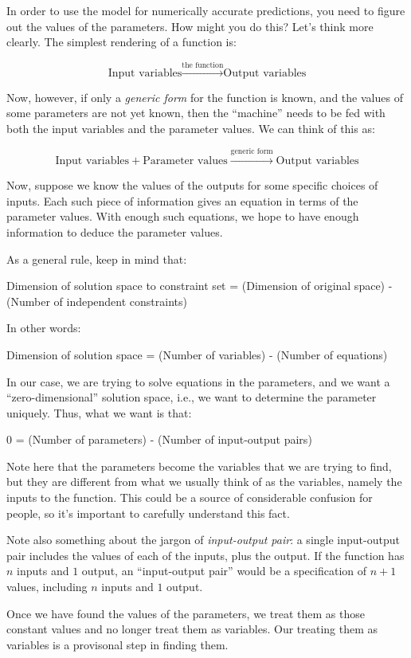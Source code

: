 \documentclass[10pt]{amsart}
\begin{document}
In order to use the model for numerically accurate predictions, you
need to figure out the values of the parameters. How might you do
this? Let's think more clearly. The simplest rendering of a function is:

$$\text{Input variables} \stackrel{\text{the function}}{\to} \text{Output variables}$$

Now, however, if only a {\em generic form} for the function is known,
and the values of some parameters are not yet known, then the
``machine'' needs to be fed with both the input variables and the parameter values. We can think of this as:

$$\text{Input variables} + \text{Parameter values} \stackrel{\text{generic form}}{\to} \text{Output variables}$$

Now, suppose we know the values of the outputs for some specific
choices of inputs. Each such piece of information gives an equation in
terms of the parameter values. With enough such equations, we hope to
have enough information to deduce the parameter values.

As a general rule, keep in mind that:

Dimension of solution space to constraint set = (Dimension of original space) - (Number of independent constraints)

In other words:

Dimension of solution space = (Number of variables) - (Number of equations)

In our case, we are trying to solve equations in the parameters, and
we want a ``zero-dimensional'' solution space, i.e., we want to
determine the parameter uniquely. Thus, what we want is that:

0 = (Number of parameters) - (Number of input-output pairs)

Note here that the parameters become the variables that we are trying
to find, but they are different from what we usually think of as the
variables, namely the inputs to the function. This could be a source
of considerable confusion for people, so it's important to carefully
understand this fact.

Note also something about the jargon of {\em input-output pair}: a
single input-output pair includes the values of each of the inputs,
plus the output. If the function has $n$ inputs and $1$ output, an
``input-output pair'' would be a specification of $n + 1$ values,
including $n$ inputs and $1$ output.

Once we have found the values of the parameters, we treat them as
those constant values and no longer treat them as variables. Our
treating them as variables is a provisonal step in finding them.
\end{document}
